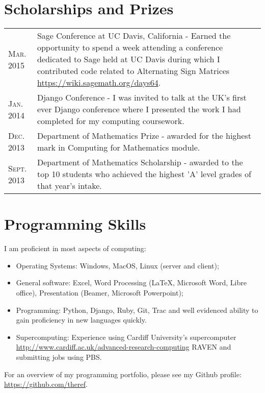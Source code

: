\documentclass[a4paper]{article}
\begin{document}
\section{Scholarships and Prizes}
\begin{tabularx}{\textwidth}{lX}

\textsc{Mar.} 2015 & Sage Conference at UC Davis, California - Earned the opportunity to spend a week attending a conference dedicated to Sage held at UC Davis during which I contributed code related to Alternating Sign Matrices \url{https://wiki.sagemath.org/days64}.\\
\textsc{Jan.} 2014 & Django Conference - I was invited to talk at the UK's first ever Django conference where I presented the work I had completed for my computing coursework.\\
\textsc{Dec.} 2013 & Department of Mathematics Prize - awarded for the highest mark in Computing for Mathematics module.\\
\textsc{Sept.} 2013 & Department of Mathematics Scholarship - awarded to the top 10 students who achieved the highest 'A' level grades of that year's intake.\\

\end{tabularx}
\section{Programming Skills}
I am proficient in most aspects of computing:

\begin{itemize}
    \item Operating Systems: Windows, MacOS, Linux (server and client);
    \item General software: Excel, Word Processing (\LaTeX, Microsoft Word, Libre office), Presentation (Beamer, Microsoft Powerpoint);
    \item Programming: Python, Django, Ruby, Git, Trac and well evidenced ability to gain proficiency in new languages quickly.
    \item Supercomputing: Experience using Cardiff University's supercomputer \url{http://www.cardiff.ac.uk/advanced-research-computing} RAVEN and submitting jobs using PBS.
\end{itemize}

For an overview of my programming portfolio, please see my Github profile: \url{https://github.com/theref}.
\end{document}
